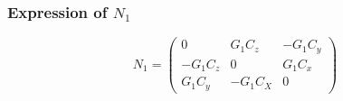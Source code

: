 \subsubsection{Expression of $N_1$}
\[N_1=\left(\begin{array}{ccc} 0&G_1C_z&-G_1C_y\\-G_1C_z&0&G_1C_x\\G_1C_y&-G_1C_X&0\end{array}\right)\]

